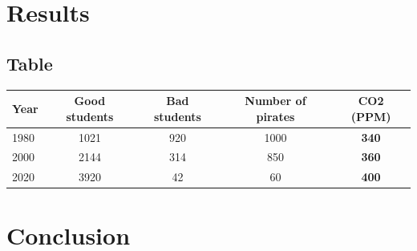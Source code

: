 \documentclass[a4paper, 12pt, english]{article}
\begin{document}
\section{Results}
\subsection{Table}
\blindtext[1]
\vspace{1cm}

\begin{center}
       \begin{tabular}{l|cccc}
    Year & Good students & Bad students & Number of pirates & \textbf{CO2 (PPM)}\\
    \midrule
    1980 & 1021          & 920          & 1000              & \textbf{340}       \\
    2000 & 2144          & 314          & 850               & \textbf{360}       \\
    2020 & 3920          & 42           & 60                & \textbf{400}       \\
    \bottomrule
    \end{tabular} 
\end{center}

\clearpage
\section{Conclusion}
\blindtext[1]

\clearpage
\newpage

%
\newpage
\appendix
\end{document}
